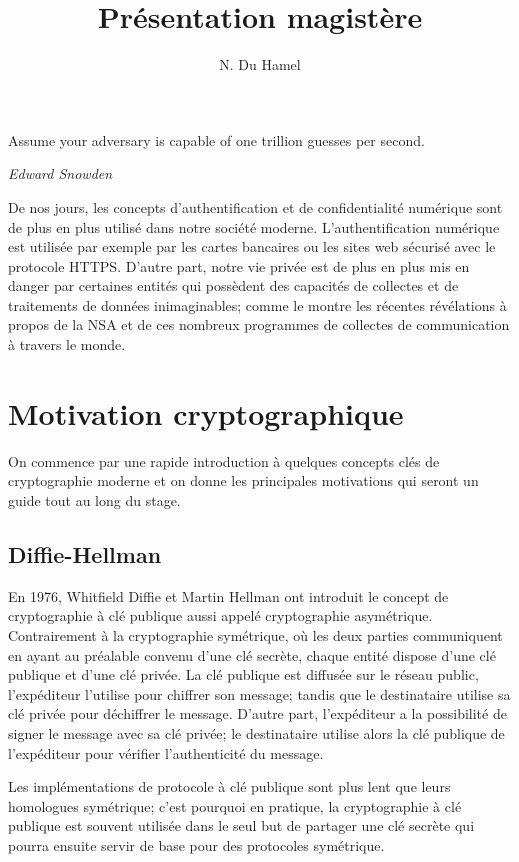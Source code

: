 \documentclass[a4paper]{article}
\theoremstyle{definition}
\theoremstyle{remark}
\numberwithin{equation}{section}
\begin{document}
\title{Présentation magistère}
\author{N. Du Hamel}
\maketitle

\epigraph{Assume your adversary is capable of one trillion guesses per second.}{\textit{Edward Snowden}}

De nos jours, les concepts d'authentification et de confidentialité numérique sont de plus en plus utilisé dans notre société moderne. L'authentification numérique est utilisée par exemple par les cartes bancaires ou les sites web sécurisé avec le protocole HTTPS. D'autre part, notre vie privée est de plus en plus mis en danger par certaines entités qui possèdent des capacités de collectes et de traitements de données inimaginables; comme le montre les récentes révélations à propos de la NSA et de ces nombreux programmes de collectes de communication à travers le monde.

\section{Motivation cryptographique}

On commence par une rapide introduction à quelques concepts clés de cryptographie moderne et on donne les principales motivations qui seront un guide tout au long du stage.

\subsection{Diffie-Hellman}
En 1976, Whitfield Diffie et Martin Hellman \cite{diffie-hellman} ont introduit le concept de cryptographie à clé publique aussi appelé cryptographie asymétrique. Contrairement à la cryptographie symétrique, où les deux parties communiquent en ayant au préalable convenu d'une clé secrète, chaque entité dispose d'une clé publique et d'une clé privée. La clé publique est diffusée sur le réseau public, l'expéditeur l'utilise pour chiffrer son message; tandis que le destinataire utilise sa clé privée pour déchiffrer le message. D'autre part, l'expéditeur a la possibilité de signer le message avec sa clé privée; le destinataire utilise alors la clé publique de l'expéditeur pour vérifier l'authenticité du message.

Les implémentations de protocole à clé publique sont plus lent que leurs homologues symétrique; c'est pourquoi en pratique, la cryptographie à clé publique est souvent utilisée dans le seul but de partager une clé secrète qui pourra ensuite servir de base pour des protocoles symétrique.
\end{document}
